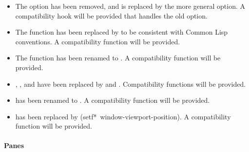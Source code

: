 \begin{itemize}
\item The  option has been removed, and is replaced by the more
general  option.  A compatibility hook will be provided that
handles the old  option.

\item The function  has been replaced by
 to be consistent with Common Lisp conventions.
A compatibility function will be provided.

\item The function  has been renamed to
.  A compatibility function will be provided.

\item {}, , and 
have been replaced by  and .
Compatibility functions will be provided.

\item {} has been renamed to
.  A compatibility function will be provided.

\item {} has been replaced by
{(setf*~window-viewport-position)}.  A compatibility function will be provided.
\end{itemize}


\paragraph {Panes}

